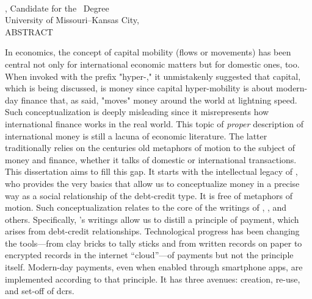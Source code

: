 %
%
\begin{center}
\vspace*{0.01in}
\large{\MakeUppercase{\MyThesisTitle}}\\
\vspace{24pt}

\normalsize{
  \MyName, Candidate for the \MyDegree\ Degree\\
  University of Missouri--Kansas City, \MyDegreeAwardYear\\
  \vspace{24pt}
  \MakeUppercase{Abstract}
  \vspace{12pt}
}

\end{center}

\doublespacing

In economics, the concept of capital mobility (flows or movements) has been central not only for international economic matters but for domestic ones, too.  When invoked with the prefix "hyper-," it unmistakenly suggested that capital, which is being discussed, is money since capital hyper-mobility is about modern-day finance that, as said, "moves" money around the world at lightning speed.  Such conceptualization is deeply misleading since it misrepresents how international finance works in the real world.   This topic of \textit{proper} description of international money is still a lacuna of economic literature. The latter traditionally relies on the centuries old metaphors of motion to the subject of money and finance, whether it talks of domestic or international transactions.  This dissertation aims to fill this gap.  It starts with the intellectual legacy of \citeauthor{innes1913}, who provides the very basics that allow us to conceptualize money in a precise way as a social relationship of the debt-credit type.  It is free of metaphors of motion.  Such conceptualization relates to the core of the writings of \citeauthor{commons1951}, \citeauthor{keynes1936}, \citeauthor{minsky1986} and others. Specifically, \citeauthor{innes1913}'s writings allow us to distill a principle of payment, which arises from debt-credit relationships.  Technological progress has been changing the tools---from clay bricks to tally sticks and from written records on paper to encrypted records in the internet ``cloud''---of payments but not the principle itself.  Modern-day payments, even when enabled through smartphone apps, are implemented according to that principle. It has three avenues: creation, re-use, and set-off of \acfp{dcr}. 

